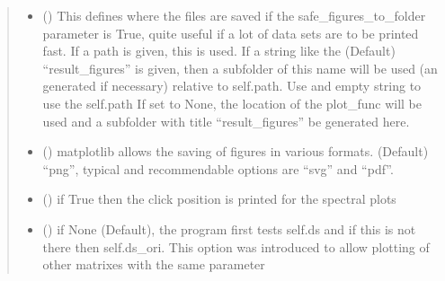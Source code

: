 \documentclass[letterpaper,10pt,english]{sphinxmanual}
\begin{document}
\begin{fulllineitems}
\begin{fulllineitems}
\begin{quote}
\begin{description}
\begin{itemize}
\item {} 
 (\sphinxstyleliteralemphasis{\sphinxupquote{, }}) \textendash{} This defines where the files are saved if the safe\_figures\_to\_folder parameter is True,
quite useful if a lot of data sets are to be printed fast.
If a path is given, this is used. If a string like the (Default) “result\_figures” is given,
then a subfolder of this name will be used (an generated if necessary)
relative to self.path. Use and empty string to use the self.path
If set to None, the location of the plot\_func will be used and
a subfolder with title “result\_figures” be generated here.

\item {} 
 (\sphinxstyleliteralemphasis{\sphinxupquote{ (}}\sphinxstyleliteralemphasis{\sphinxupquote{)}}\sphinxstyleliteralemphasis{\sphinxupquote{, }}) \textendash{} matplotlib allows the saving of figures in various formats. (Default) “png”,
typical and recommendable options are “svg” and “pdf”.

\item {} 
 (\sphinxstyleliteralemphasis{\sphinxupquote{, }}) \textendash{} if True then the click position is printed for the spectral plots

\item {} 
 (\sphinxstyleliteralemphasis{\sphinxupquote{, }}) \textendash{} if None (Default), the program first tests self.ds and if this is not there then self.ds\_ori.
This option was introduced to allow plotting of other matrixes with the same parameter

\end{itemize}


\end{description}
\end{quote}
\end{fulllineitems}
\end{fulllineitems}
\end{document}
